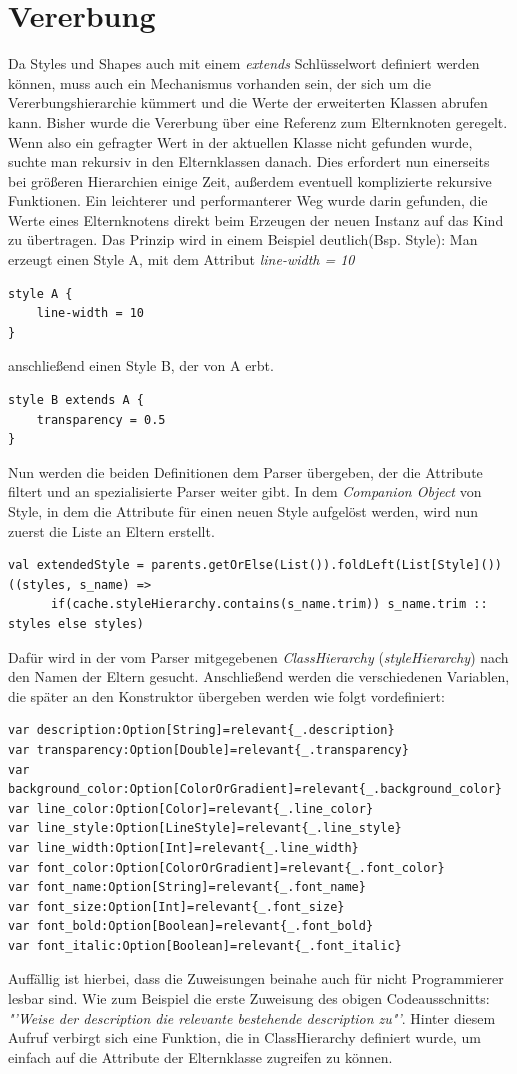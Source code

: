 \section{Vererbung}\label{sectionInheritance}
Da Styles und Shapes auch mit einem \textit{extends} Schlüsselwort definiert werden können, muss auch ein Mechanismus vorhanden sein, der sich um die Vererbungshierarchie kümmert und die Werte der erweiterten Klassen abrufen kann.
Bisher wurde die Vererbung über eine Referenz zum Elternknoten geregelt. Wenn also ein gefragter Wert in der aktuellen Klasse nicht gefunden wurde, suchte man rekursiv in den Elternklassen danach.
Dies erfordert nun einerseits bei größeren Hierarchien einige Zeit, außerdem eventuell komplizierte rekursive Funktionen.
Ein leichterer und performanterer Weg wurde darin gefunden, die Werte eines Elternknotens direkt beim Erzeugen der neuen Instanz auf das Kind zu übertragen.
Das Prinzip wird in einem Beispiel deutlich(Bsp. Style):
Man erzeugt einen Style A, mit dem Attribut \textit{line-width = 10}\begin{lstlisting}[style=spray]
style A {
    line-width = 10
}
\end{lstlisting}anschließend einen Style B, der von A erbt.\begin{lstlisting}[style=spray]
style B extends A {
    transparency = 0.5
}
\end{lstlisting}
Nun werden die beiden Definitionen dem Parser übergeben, der die Attribute filtert und an spezialisierte Parser weiter gibt. In dem \textit{Companion Object} von Style, in dem die Attribute für einen neuen Style aufgelöst werden, wird nun zuerst die Liste an Eltern erstellt.
\begin{lstlisting}[style=scala]
val extendedStyle = parents.getOrElse(List()).foldLeft(List[Style]())((styles, s_name) =>
      if(cache.styleHierarchy.contains(s_name.trim)) s_name.trim :: styles else styles)
\end{lstlisting}Dafür wird in der vom Parser mitgegebenen \textit{ClassHierarchy} (\textit{styleHierarchy}) nach den Namen der Eltern gesucht.
Anschließend werden die verschiedenen Variablen, die später an den Konstruktor übergeben werden wie folgt vordefiniert:
\begin{lstlisting}[style=scala]
var description:Option[String]=relevant{_.description}
var transparency:Option[Double]=relevant{_.transparency} 
var background_color:Option[ColorOrGradient]=relevant{_.background_color}
var line_color:Option[Color]=relevant{_.line_color}
var line_style:Option[LineStyle]=relevant{_.line_style}
var line_width:Option[Int]=relevant{_.line_width}
var font_color:Option[ColorOrGradient]=relevant{_.font_color}
var font_name:Option[String]=relevant{_.font_name}
var font_size:Option[Int]=relevant{_.font_size}
var font_bold:Option[Boolean]=relevant{_.font_bold}
var font_italic:Option[Boolean]=relevant{_.font_italic}
\end{lstlisting}Auffällig ist hierbei, dass die Zuweisungen beinahe auch für nicht Programmierer lesbar sind. Wie zum Beispiel die erste Zuweisung des obigen Codeausschnitts: \textit{"'Weise der description die relevante bestehende description zu"'}. Hinter diesem Aufruf verbirgt sich eine Funktion, die in ClassHierarchy definiert wurde, um einfach auf die Attribute der Elternklasse zugreifen zu können.
